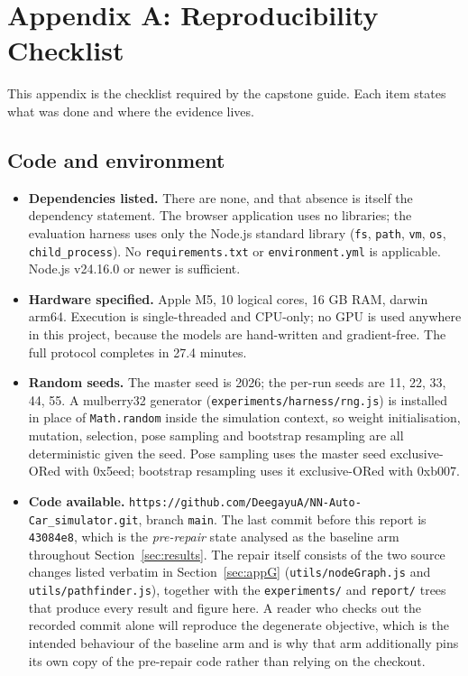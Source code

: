 \documentclass[conference]{IEEEtran}
\begin{document}
\section*{Appendix A: Reproducibility Checklist}

\label{sec:appA}

This appendix is the checklist required by the capstone guide. Each item states what was done and where the evidence lives.

\subsection{Code and environment}

\begin{itemize}
\item[$\boxtimes$] \textbf{Dependencies listed.} There are none, and that absence is itself the dependency statement. The browser application uses no libraries; the evaluation harness uses only the Node.js standard library (\texttt{fs}, \texttt{path}, \texttt{vm}, \texttt{os}, \texttt{child\_process}). No \texttt{requirements.txt} or \texttt{environment.yml} is applicable. Node.js v24.16.0 or newer is sufficient.
\item[$\boxtimes$] \textbf{Hardware specified.} Apple M5, 10 logical cores, 16 GB RAM, darwin arm64. Execution is single-threaded and CPU-only; no GPU is used anywhere in this project, because the models are hand-written and gradient-free. The full protocol completes in 27.4 minutes.
\item[$\boxtimes$] \textbf{Random seeds.} The master seed is 2026; the per-run seeds are 11, 22, 33, 44, 55. A mulberry32 generator (\texttt{experiments/harness/rng.js}) is installed in place of \texttt{Math.random} inside the simulation context, so weight initialisation, mutation, selection, pose sampling and bootstrap resampling are all deterministic given the seed. Pose sampling uses the master seed exclusive-ORed with 0x5eed; bootstrap resampling uses it exclusive-ORed with 0xb007.
\item[$\boxtimes$] \textbf{Code available.} \texttt{https://github.com/DeegayuA/NN-Auto-Car\_simulator.git}, branch \texttt{main}. The last commit before this report is \texttt{43084e8}, which is the \emph{pre-repair} state analysed as the baseline arm throughout Section~\ref{sec:results}. The repair itself consists of the two source changes listed verbatim in Section~\ref{sec:appG} (\texttt{utils/nodeGraph.js} and \texttt{utils/pathfinder.js}), together with the \texttt{experiments/} and \texttt{report/} trees that produce every result and figure here. A reader who checks out the recorded commit alone will reproduce the degenerate objective, which is the intended behaviour of the baseline arm and is why that arm additionally pins its own copy of the pre-repair code rather than relying on the checkout.
\end{itemize}
\end{document}
